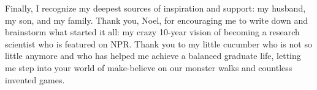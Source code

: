Finally, I recognize my deepest sources of inspiration and support: my husband, my son, and my family. Thank you, Noel, for encouraging me to write down and brainstorm what started it all: my crazy 10-year vision of becoming a research scientist who is featured on NPR. Thank you to my little cucumber who is not so little anymore and who has helped me achieve a balanced graduate life, letting me step into your world of make-believe on our monster walks and countless invented games.


